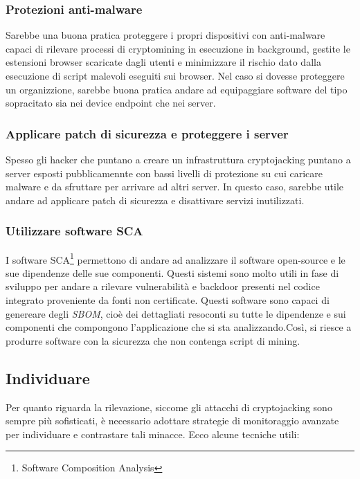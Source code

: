 \documentclass[12pt,a4paper]{article}
\begin{document}
\subsubsection*{Protezioni anti-malware}
Sarebbe una buona pratica proteggere i propri dispositivi con anti-malware
capaci di rilevare processi di cryptomining in esecuzione in background, gestite
le estensioni browser scaricate dagli utenti e minimizzare il rischio dato dalla
esecuzione di script malevoli eseguiti sui browser. Nel caso si dovesse
proteggere un organizzione, sarebbe buona pratica andare ad equipaggiare software
del tipo sopracitato sia nei device endpoint che nei server.

\subsubsection*{Applicare patch di sicurezza e proteggere i server}
Spesso gli hacker che puntano a creare un infrastruttura cryptojacking puntano a
server esposti pubblicamennte con bassi livelli di protezione su cui caricare
malware e da sfruttare per arrivare ad altri server. In questo caso, sarebbe
utile andare ad applicare patch di sicurezza e disattivare servizi inutilizzati.

\subsubsection*{Utilizzare software SCA}
I software SCA\footnote{Software Composition Analysis} permettono di andare ad
analizzare il software open-source e le sue dipendenze delle sue componenti.
Questi sistemi sono molto utili in fase di sviluppo per andare a rilevare
vulnerabilità e backdoor presenti nel codice integrato proveniente da fonti non
certificate. Questi software sono capaci di genereare degli \textit{SBOM}, cioè
dei dettagliati resoconti su tutte le dipendenze e sui componenti che compongono
l'applicazione che si sta analizzando.Così, si riesce a produrre software con la
sicurezza che non contenga script di mining.

\subsection{Individuare}
Per quanto riguarda la rilevazione, siccome gli attacchi di cryptojacking sono
sempre più sofisticati, è necessario adottare strategie di monitoraggio avanzate
per individuare e contrastare tali minacce. Ecco alcune tecniche utili:
\end{document}
